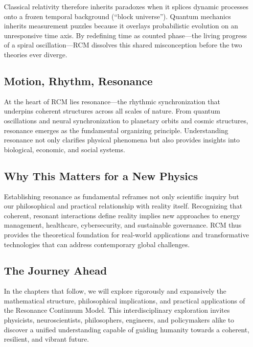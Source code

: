 Classical relativity therefore inherits paradoxes when it splices dynamic
processes onto a frozen temporal background (“block universe”).  
Quantum mechanics inherits measurement puzzles because it overlays
probabilistic evolution on an unresponsive time axis.  
By redefining time as counted phase—the living progress of a spiral
oscillation—RCM dissolves this shared misconception before the two theories
ever diverge.


\subsection{Motion, Rhythm, Resonance}\label{subsec:motion-rhythm-resonance}

At the heart of RCM lies resonance—the rhythmic synchronization that underpins coherent structures across all scales of nature. From quantum oscillations and neural synchronization to planetary orbits and cosmic structures, resonance emerges as the fundamental organizing principle. Understanding resonance not only clarifies physical phenomena but also provides insights into biological, economic, and social systems.
\subsection{Why This Matters for a New Physics}\label{subsec:why-this-matters-for-a-new-physics}
Establishing resonance as fundamental reframes not only scientific inquiry but our philosophical and practical relationship with reality itself. Recognizing that coherent, resonant interactions define reality implies new approaches to energy management, healthcare, cybersecurity, and sustainable governance. RCM thus provides the theoretical foundation for real-world applications and transformative technologies that can address contemporary global challenges.
\subsection{The Journey Ahead}\label{subsec:the-journey-ahead}
In the chapters that follow, we will explore rigorously and expansively the mathematical structure, philosophical implications, and practical applications of the Resonance Continuum Model. This interdisciplinary exploration invites physicists, neuroscientists, philosophers, engineers, and policymakers alike to discover a unified understanding capable of guiding humanity towards a coherent, resilient, and vibrant future.

